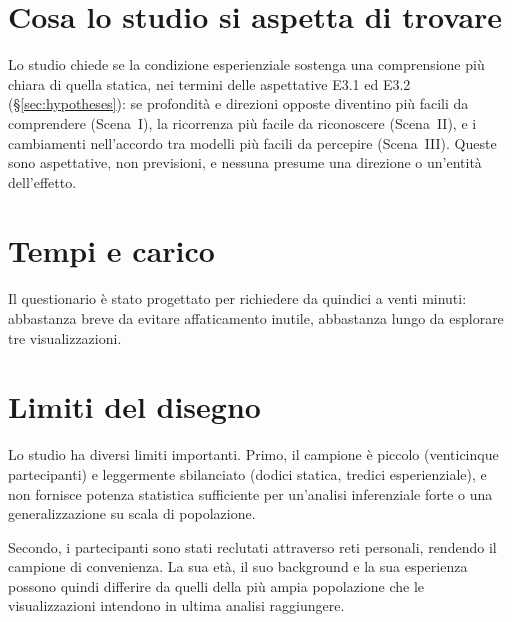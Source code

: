 \section{Cosa lo studio si aspetta di trovare}
\label{sec:eval-expectations}

Lo studio chiede se la condizione esperienziale sostenga una comprensione più chiara di quella statica, nei termini delle aspettative E3.1 ed E3.2 (\S\ref{sec:hypotheses}): se profondità e direzioni opposte diventino più facili da comprendere (Scena~I), la ricorrenza più facile da riconoscere (Scena~II), e i cambiamenti nell'accordo tra modelli più facili da percepire (Scena~III). Queste sono aspettative, non previsioni, e nessuna presume una direzione o un'entità dell'effetto.

\section{Tempi e carico}
\label{sec:eval-burden}

Il questionario è stato progettato per richiedere da quindici a venti minuti: abbastanza breve da evitare affaticamento inutile, abbastanza lungo da esplorare tre visualizzazioni.

\section{Limiti del disegno}
\label{sec:eval-limitations}

Lo studio ha diversi limiti importanti. Primo, il campione è piccolo (venticinque partecipanti) e leggermente sbilanciato (dodici statica, tredici esperienziale), e non fornisce potenza statistica sufficiente per un'analisi inferenziale forte o una generalizzazione su scala di popolazione.

Secondo, i partecipanti sono stati reclutati attraverso reti personali, rendendo il campione di convenienza. La sua età, il suo background e la sua esperienza possono quindi differire da quelli della più ampia popolazione che le visualizzazioni intendono in ultima analisi raggiungere.

